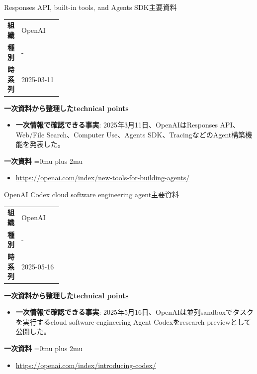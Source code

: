 \begin{technicalnote}{Responses API, built-in tools, and Agents SDK}{主要資料}
\begingroup
\begin{tabularx}{\linewidth}{@{}>{\bfseries}p{0.22\linewidth}X@{}}
組織 & OpenAI \\
種別 & - \\
時系列 & 2025-03-11 \\
\end{tabularx}
\smallskip
{\bfseries 一次資料から整理したtechnical points}
\begin{itemize}[leftmargin=1.5em,itemsep=0.35em]
\item \textbf{一次情報で確認できる事実}: 2025年3月11日、OpenAIはResponses API、Web/File Search、Computer Use、Agents SDK、TracingなどのAgent構築機能を発表した。
\end{itemize}
\begin{samepage}
{\bfseries 一次資料}
\begingroup\sloppy
\Urlmuskip=0mu plus 2mu\relax
\begin{itemize}[leftmargin=1.5em,itemsep=0.25em]
\item {\scriptsize\url{https://openai.com/index/new-tools-for-building-agents/}}
\end{itemize}
\endgroup
\end{samepage}
\endgroup
\end{technicalnote}
\medskip

\begin{technicalnote}{OpenAI Codex cloud software engineering agent}{主要資料}
\begingroup
\begin{tabularx}{\linewidth}{@{}>{\bfseries}p{0.22\linewidth}X@{}}
組織 & OpenAI \\
種別 & - \\
時系列 & 2025-05-16 \\
\end{tabularx}
\smallskip
{\bfseries 一次資料から整理したtechnical points}
\begin{itemize}[leftmargin=1.5em,itemsep=0.35em]
\item \textbf{一次情報で確認できる事実}: 2025年5月16日、OpenAIは並列sandboxでタスクを実行するcloud software-engineering Agent Codexをresearch previewとして公開した。
\end{itemize}
\begin{samepage}
{\bfseries 一次資料}
\begingroup\sloppy
\Urlmuskip=0mu plus 2mu\relax
\begin{itemize}[leftmargin=1.5em,itemsep=0.25em]
\item {\scriptsize\url{https://openai.com/index/introducing-codex/}}
\end{itemize}
\endgroup
\end{samepage}
\endgroup
\end{technicalnote}
\medskip

